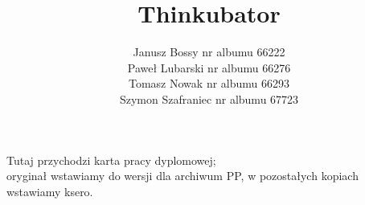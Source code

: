 \documentclass[polish,a4paper,twoside,12pt]{ppfcmthesis}
\author{Janusz Bossy nr albumu 66222\\ Paweł Lubarski nr albumu 66276\\ Tomasz
Nowak nr albumu 66293 \\ Szymon Szafraniec nr albumu 67723} %
\title{Thinkubator}                   %
\begin{document}
\frontmatter\pagestyle{empty}%
\maketitle\cleardoublepage%

\thispagestyle{empty}\vspace*{\fill}%
\begin{center}Tutaj przychodzi karta pracy dyplomowej;\\oryginał wstawiamy do wersji dla archiwum PP, w pozostałych kopiach wstawiamy ksero.\end{center}%
\vfill\cleardoublepage%

\pagestyle{ppfcmthesis}%
\tableofcontents* \cleardoublepage%

\mainmatter%







\cleardoublepage\appendix%

{\raggedright\sloppy\small}

\ppcolophon
\end{document}
